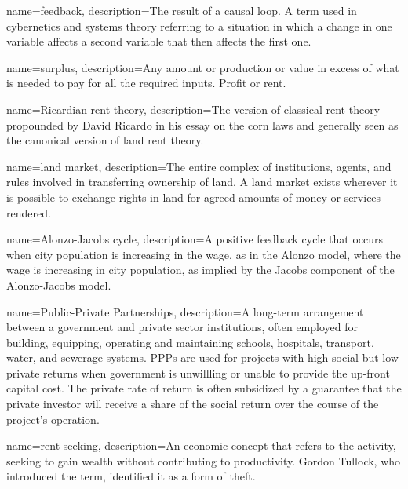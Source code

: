 
{
name=feedback,
description={The result of a causal loop. A term used in cybernetics and systems theory referring to a situation in which a change in one variable affects a second variable that then affects the first one.}
}

{
name=surplus,
description={Any amount or production or value in excess of what  is needed to pay for all the required inputs. Profit or rent. }
}

{
name=Ricardian rent theory,
description={The version of classical rent theory propounded by David Ricardo in his essay on the corn laws and generally seen as the  canonical version of land rent theory.}
}

{
name=land market,
description={The entire complex of institutions, agents, and rules involved in transferring ownership of land. A land market exists wherever it is possible to exchange rights in land for agreed amounts of money or services rendered.}
}

{
name=Alonzo-Jacobs cycle,
description={A positive \gls{feedback} cycle that occurs when city population is increasing in the wage, as in the Alonzo model, where the wage is increasing in city population, as implied by the Jacobs component of the \gls{Alonzo-Jacobs model}.}
}

{
name=Public-Private Partnerships,
description={A long-term arrangement between a government and private sector institutions, often  employed for building, equipping, operating and maintaining schools, hospitals, transport, water, and sewerage systems. PPPs are used for projects with high social but low private returns when government is unwillling or unable to provide the up-front capital cost. The private rate of return is often subsidized by a guarantee that the private investor will receive a share of the social return over the course of the project's operation.}
}

{
name=rent-seeking,
description={An economic concept that refers to the activity, seeking to gain wealth without contributing to productivity. Gordon Tullock, who introduced  the term, identified it as a form of theft\cite{tullockWelfareCostsTariffs1967}.}
}

